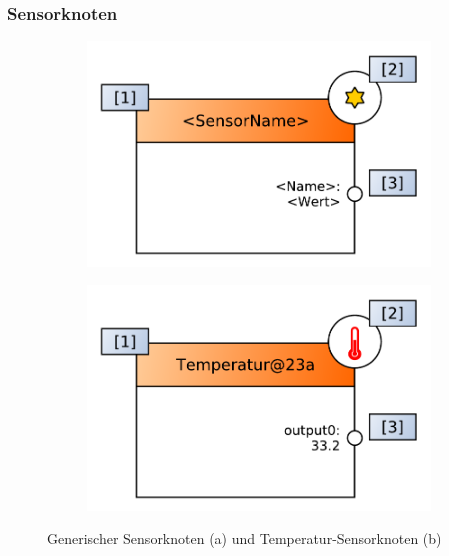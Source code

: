 \subsubsection{Sensorknoten}
\begin{figure}[h]
\centering
\begin{subfigure}{.5\textwidth}
  \centering
  \includegraphics[width=1\linewidth]{bilder/chapter4/chapter4_3/genericsensornode.pdf}
  \caption{}
  \label{fig:genericsensornode}
\end{subfigure}%
\begin{subfigure}{.5\textwidth}
  \centering
  \includegraphics[width=1\linewidth]{bilder/chapter4/chapter4_3/instancesensornode.pdf}
  \caption{}
  \label{fig:sensornodetemperature}
\end{subfigure}
    \caption{Generischer Sensorknoten (a) und Temperatur-Sensorknoten (b)}
    \label{fig:sensornodes}
\end{figure}

